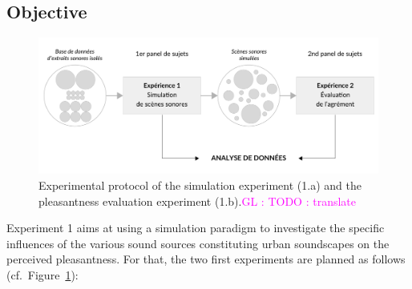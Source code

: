 \documentclass[12pt]{elsarticle}
\newcommand{\gl}[1]{\textcolor{magenta}{GL : #1}}
\newcommand{\cf}{cf.}
\begin{document}
\subsection{Objective}

\begin{figure}[t]
        \includegraphics[width=\linewidth]{gfx/5.pdf}
        \caption{Experimental protocol of the simulation experiment (1.a) and the pleasantness evaluation experiment (1.b).\gl{TODO : translate}}\label{fig:xp1_2}
\end{figure}


Experiment 1 aims at using a simulation paradigm to investigate the specific influences of the various sound sources constituting urban soundscapes on the perceived pleasantness. For that, the two first experiments are planned as follows (\cf~Figure~\ref{fig:xp1_2}):
\end{document}

